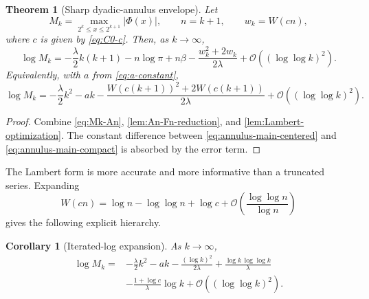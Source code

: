 \documentclass[11pt,oneside]{article}
\newtheorem{theorem}{Theorem}[section]
\newtheorem{corollary}[corollary]{Corollary}
\theoremstyle{definition}
\theoremstyle{remark}
\newcommand{\bigO}{\mathcal O}
\newcommand{\PhiF}{\Phi}
\begin{document}
\begin{theorem}[Sharp dyadic-annulus envelope]
\label{thm:annulus-main}
Let
\[
 M_k=\max_{2^k\le x\le2^{k+1}}|\PhiF(x)|,
 \qquad n=k+1,
 \qquad w_k=W(cn),
\]
where \(c\) is given by \eqref{eq:C0-c}.  Then, as \(k\to\infty\),
\begin{equation}
\boxed{
 \log M_k=
 -\frac{\lambda}{2}k(k+1)-n\log\pi+n\beta
 -\frac{w_k^2+2w_k}{2\lambda}
 +\bigO\!\left((\log\log k)^2\right).}
 \label{eq:annulus-main-centered}
\end{equation}
Equivalently, with \(a\) from \eqref{eq:a-constant},
\begin{equation}
 \log M_k=
 -\frac\lambda2k^2-ak
 -\frac{W(c(k+1))^2+2W(c(k+1))}{2\lambda}
 +\bigO\!\left((\log\log k)^2\right).
 \label{eq:annulus-main-compact}
\end{equation}
\end{theorem}

\begin{proof}
Combine \eqref{eq:Mk-An}, \cref{lem:An-Fn-reduction}, and
\cref{lem:Lambert-optimization}.  The constant difference between
\eqref{eq:annulus-main-centered} and \eqref{eq:annulus-main-compact} is
absorbed by the error term.
\end{proof}

The Lambert form is more accurate and more informative than a truncated
series.  Expanding
\begin{equation}
 W(cn)=\log n-\log\log n+\log c
 +\bigO\!\left(\frac{\log\log n}{\log n}\right)
 \label{eq:W-expansion}
\end{equation}
gives the following explicit hierarchy.

\begin{corollary}[Iterated-log expansion]
\label{cor:annulus-expanded}
As \(k\to\infty\),
\begin{equation}
\begin{split}
 \log M_k={}&-\frac\lambda2k^2-ak
 -\frac{(\log k)^2}{2\lambda}
 +\frac{\log k\,\log\log k}{\lambda}\\
 &-\frac{1+\log c}{\lambda}\log k
 +\bigO\!\left((\log\log k)^2\right).
\end{split}
\label{eq:annulus-expanded-k}
\end{equation}
\end{corollary}
\end{document}
